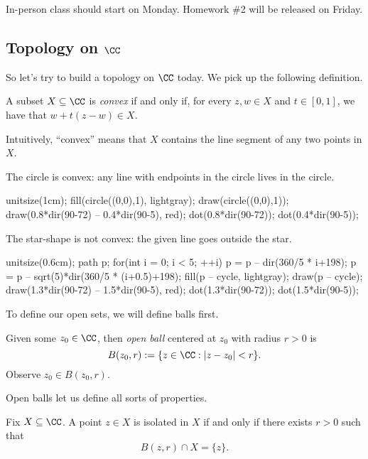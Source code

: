 
In-person class should start on Monday. Homework \#2 will be released on Friday.

\subsection{Topology on \texorpdfstring{$\CC$}{C}}
So let's try to build a topology on $\CC$ today. We pick up the following definition.
\begin{definition}[Convex]
	A subset $X\subseteq\CC$ is \textit{convex} if and only if, for every $z,w\in X$ and $t\in[0,1]$, we have that $w+t(z-w)\in X$.
\end{definition}
Intuitively, ``convex'' means that $X$ contains the line segment of any two points in $X$.
\begin{example}
	The circle is convex: any line with endpoints in the circle lives in the circle.
	\begin{center}
		\begin{asy}
			unitsize(1cm);
			fill(circle((0,0),1), lightgray);
			draw(circle((0,0),1));
			draw(0.8*dir(90-72) -- 0.4*dir(90-5), red);
			dot(0.8*dir(90-72));
			dot(0.4*dir(90-5));
		\end{asy}
	\end{center}
\end{example}
\begin{nex}
	The star-shape is not convex: the given line goes outside the star.
	\begin{center}
		\begin{asy}
			unitsize(0.6cm);
			path p;
			for(int i = 0; i < 5; ++i)
			{
				p = p -- dir(360/5 * i+198);
				p = p -- sqrt(5)*dir(360/5 * (i+0.5)+198);
			}
			fill(p -- cycle, lightgray);
			draw(p -- cycle);
			draw(1.3*dir(90-72) -- 1.5*dir(90-5), red);
			dot(1.3*dir(90-72));
			dot(1.5*dir(90-5));
		\end{asy}
	\end{center}
\end{nex}
To define our open sets, we will define balls first.
\begin{definition}
	Given some $z_0\in\CC$, then \textit{open ball} centered at $z_0$ with radius $r>0$ is
	\[B(z_0,r):=\{z\in\CC:|z-z_0|<r\}.\]
	Observe $z_0\in B(z_0,r)$.
\end{definition}
Open balls let us define all sorts of properties.
\begin{defi}[Isolated]
	Fix $X\subseteq\CC$. A point $z\in X$ is isolated in $X$ if and only if there exists $r>0$ such that
	\[B(z,r)\cap X=\{z\}.\]
\end{defi}
